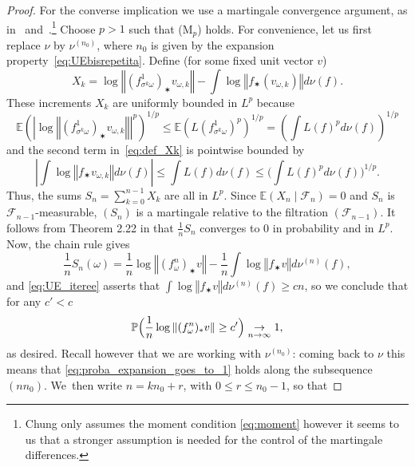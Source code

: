 \documentclass[11pt]{article}
\newcommand{\norm}[1]{{\left\Vert#1\right\Vert}}
\newcommand{\abs}[1]{\left\vert#1\right\vert}
\newcommand{\unsur}[1]{\frac{1}{#1}}
\newcommand{\lrpar}[1]{\left(#1\right)}
\newcommand{\Blrpar}[1]{\Bigl(#1\Bigr)}
\newcommand{\bblrpar}[1]{\biggl(#1\biggr)}
\newcommand{\ee}{\mathbb{E}}
\newcommand{\pp}{\mathbb{P}}\let\P\pp
\theoremstyle{plain}
\theoremstyle{definition}
\numberwithin{equation}{section}
\begin{document}
\begin{proof}
For the converse implication we use a martingale convergence argument, as in~\cite[Lem.\,4.3.5]{liu_thesis} and~\cite[Prop.\,2.2]{chung}.\footnote{Chung only assumes the moment condition \eqref{eq:moment} however it seems to us that a stronger assumption is needed for the
control of the martingale differences.} Choose $p>1$ such that
(M$_{p}$) holds.
For convenience, let us first replace $\nu$ by $\nu^{(n_0)}$, where $n_0$ is given by the expansion property~\eqref{eq:UEbisrepetita}.
Define (for some fixed unit vector $v$)
\begin{equation}\label{eq:def_Xk}
X_k = \log\norm{ (f^1_{\sigma^k\omega})_\varstar v_{\omega, k}} -
\int \log\norm{ f_\varstar ( v_{\omega, k})} d\nu(f).
\end{equation}
These increments $ X_k $ are uniformly bounded in $L^p$ because
\begin{equation*}
\ee\lrpar{\abs{\log\norm{ (f^1_{\sigma^k\omega})_\varstar v_{\omega, k}}}^p }^{1/p} \leq
\ee\lrpar{ L(f^1_{\sigma^k\omega})^p}^{1/p} = \lrpar{\int L(f)^p d\nu(f)}^{1/p}
\end{equation*}
and the second term in~\eqref{eq:def_Xk} is pointwise bounded by
\begin{equation*}
\abs{\int \log\norm{ f_\varstar v_{\omega, k}} d\nu(f)} \leq \int L(f) d\nu(f) \leq \bblrpar{\int L(f)^p d\nu(f)}^{1/p}.
\end{equation*}
Thus, the sums $S_n = \sum_{k=0}^{n-1} X_k$ are all in $L^p$. Since $\ee({X_{n}\mid \mathcal F_{n}})= 0$ and $S_n$ is $\mathcal{F}_{n-1}$-measurable, $(S_n)$ is a martingale relative to the filtration $(\mathcal F_{n-1})$.
It follows from Theorem 2.22 in \cite[\S 2.7]{hall-heyde} that
$\frac{1}{n}S_n$ converges to $0$ in probability and in $L^p$.
Now, the chain rule gives
\begin{equation*}
\frac{1}{n} S_n(\omega)=
\unsur{n}\log \norm { (f^n_\omega)_\varstar v} - \unsur{n} \int \log \norm { f_\varstar v} d\nu^{(n)}(f),
\end{equation*}
and \eqref{eq:UE_iteree} asserts that
$\int \log {\norm{f_\varstar v}} d\nu^{(n)}(f) \geq c n$, so we conclude that for any $c'<c$
\begin{equation}\label{eq:proba_expansion_goes_to_1}
\pp\Blrpar{ \unsur{n}\log \norm{ (f^n_\omega)_\varstar v} \geq c'} \underset{n\to\infty}{\to} 1,
\end{equation}
as desired. Recall however that we are working with $\nu^{(n_0)}$:
coming back to $\nu$ this means that \eqref{eq:proba_expansion_goes_to_1} holds
along the subsequence $(nn_0)$. We~then write $n = kn_0+ r$, with $0\leq r \leq n_0-1$, so that

\end{proof}
\end{document}
